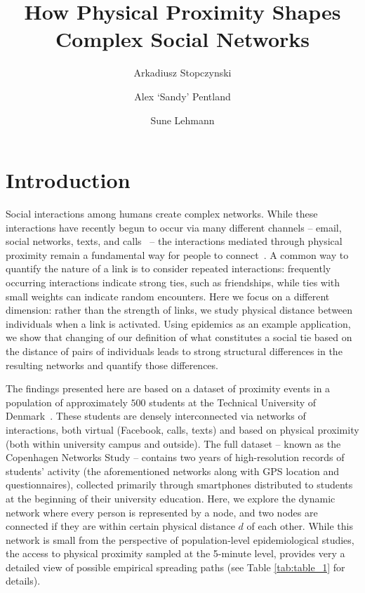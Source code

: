 \documentclass[fleqn,10pt]{wlscirep}
\title{How Physical Proximity Shapes Complex Social Networks}
\author[1,2]{Arkadiusz Stopczynski}
\author[2]{Alex `Sandy' Pentland}
\author[1,3,*]{Sune Lehmann}
\affil[1]{Technical University of Denmark, Lyngby, Denmark}
\affil[2]{Media Lab, Massachusetts Institute of Technology, Cambridge, MA, USA}
\affil[3]{Niels Bohr Institute, University of Copenhagen, Copenhagen, Denmark}
\affil[*]{sljo@dtu.dk}
\begin{document}
\flushbottom
\maketitle
\thispagestyle{empty}

\section*{Introduction}
Social interactions among humans create complex networks.
While these interactions have recently begun to occur via many different channels -- email, social networks, texts, and calls~\cite{lazer2009life} -- the interactions mediated through physical proximity remain a fundamental way for people to connect~\cite{eagle2009inferring}.
A common way to quantify the nature of a link is to consider repeated interactions: frequently occurring interactions indicate strong ties, such as friendships, while ties with small weights can indicate random encounters.
Here we focus on a different dimension: rather than the strength of links, we study physical distance between individuals when a link is activated.
Using epidemics as an example application, we show that changing of our definition of what constitutes a social tie based on the distance of pairs of individuals leads to strong structural differences in the resulting networks and quantify those differences. 

The findings presented here are based on a dataset of proximity events in a population of approximately $500$ students at the Technical University of Denmark~\cite{10.1371/journal.pone.0095978}. 
These students are densely interconnected via networks of interactions, both virtual (Facebook, calls, texts) and based on physical proximity (both within university campus and outside).
The full dataset -- known as the Copenhagen Networks Study -- contains two years of high-resolution records of students' activity (the aforementioned networks along with GPS location and questionnaires), collected primarily through smartphones distributed to students at the beginning of their university education.
Here, we explore the dynamic network where every person is represented by a node, and two nodes are connected if they are within certain physical distance $d$ of each other.
While this network is small from the perspective of population-level epidemiological studies, the access to physical proximity sampled at the 5-minute level, provides very a detailed view of possible empirical spreading paths (see Table \ref{tab:table_1} for details).
\end{document}
